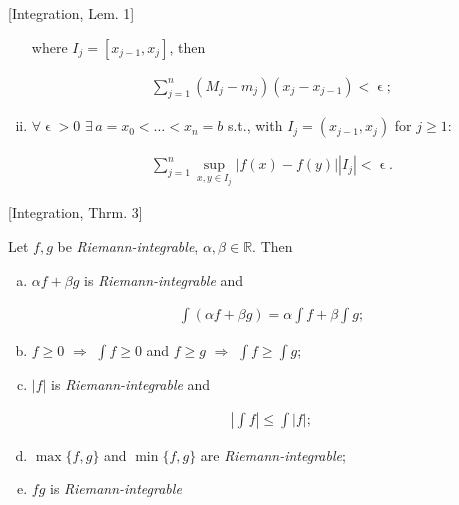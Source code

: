 \documentclass[10pt]{article} %
\renewcommand{\leq}{\leqslant}
\renewcommand{\geq}{\geqslant}
\begin{document}
\begin{multicols}{3}
\begin{lemma}{[Integration, Lem. 1]}{}
\begin{enumerate}[(i)]
            where $I_j = [x_{j-1}, x_j]$, then

                \begin{align*}
                    \sum_{j=1}^n (M_j - m_j)(x_j - x_{j-1}) < \upvarepsilon;
                \end{align*}

            \item $\forall \upvarepsilon > 0$ $\exists\, a = x_0 < \hdots < x_n = b$ s.t., with $I_j = (x_{j-1}, x_j)$ for $j \geq 1$:

                \begin{align*}
                    \sum_{j = 1}^n \sup_{x,y \in I_j} |f(x) - f(y)||I_j| < \upvarepsilon.
                \end{align*}
        \end{enumerate}

\end{lemma}

\begin{theorem}{[Integration, Thrm. 3]}{}

    Let $f,g$ be \emph{Riemann-integrable}, $\alpha, \beta \in \mathbb{R}$. Then

        \begin{enumerate}[(a)]
            \setlength{\parskip}{0em}
            \item $\alpha f + \beta g$ is \emph{Riemann-integrable} and

                \begin{align*}
                    \int (\alpha f + \beta g) = \alpha \int f + \beta \int g;
                \end{align*}

            \item $f \geq 0$ $\Rightarrow$ $\int f \geq 0$ and $f \geq g$ $\Rightarrow$ $\int f \geq \int g$;
            \item $|f|$ is \emph{Riemann-integrable} and 

                \begin{align*}
                    \left| \int f \right| \leq \int |f|;
                \end{align*}

            \item $\max\{f,g\}$ and $\min\{f,g\}$ are \emph{Riemann-integrable};
            \item $fg$ is \emph{Riemann-integrable}
        \end{enumerate}


\end{theorem}
\end{multicols}
\end{document}
